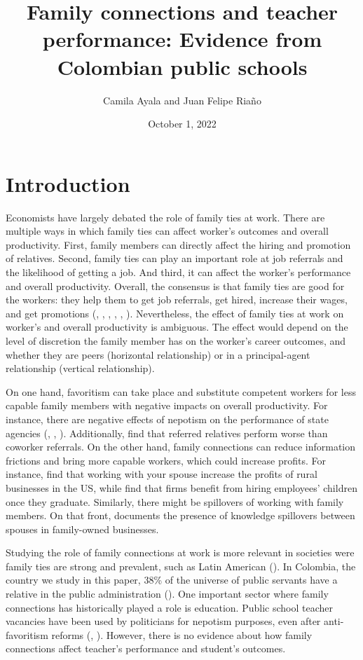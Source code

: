\documentclass[12pt,runningheads]{article}
\title{Family connections and teacher performance: Evidence from Colombian public schools}
\author{Camila Ayala and Juan Felipe Riaño}
\date{October 1, 2022}
\begin{document}
    
    


\newpage
\section{Introduction} 

Economists have largely debated the role of family ties at work. There are multiple ways in which family ties can affect worker's outcomes and overall productivity. First, family members can directly affect the hiring and promotion of relatives. Second, family ties can play an important role at job referrals and the likelihood of getting a job. And third, it can affect the worker's performance and overall productivity. Overall, the consensus is that family ties are good for the workers: they help them to get job referrals, get hired, increase their wages, and get promotions (, , , , , ). Nevertheless, the effect of family ties at work on worker's and overall productivity  is ambiguous. The effect would depend on the level of discretion the family member has on the worker's career outcomes, and whether they are peers (horizontal relationship) or in a principal-agent relationship (vertical relationship). 

On one hand, favoritism can take place and substitute competent workers for less capable family members with negative impacts on overall productivity. For instance, there are negative effects of nepotism on the performance of state agencies (, , ). Additionally, \cite{Beaman2012} find that referred relatives perform worse than coworker referrals. On the other hand, family connections can reduce information frictions and bring more capable workers, which could increase profits. For instance, \cite{Mcdonald2017} find that working with your spouse increase the profits of rural businesses in the US, while \cite{kramarz2014} find that firms benefit from hiring employees' children once they graduate. Similarly, there might be spillovers of working with family members. On that front, \cite{Parker2008} documents the presence of knowledge spillovers between spouses in family-owned businesses. 

Studying the role of family connections at work is more relevant in societies were family ties are strong and prevalent, such as Latin American (). In Colombia, the country we study in this paper, 38\% of the universe of public servants have a relative in the public administration (). One important sector where family connections has historically played a role is education. Public school teacher vacancies have been used by politicians for nepotism purposes, even after anti-favoritism reforms (, ). However, there is no evidence about how family connections affect teacher's performance and student's outcomes. 
\end{document}
